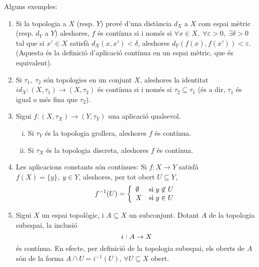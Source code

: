\documentclass[../main.tex]{subfiles}
\begin{document}
\begin{ej}
\label{ej:appcontesptop} Alguns exemples:
\begin{enumerate}[(1)]
    \item Si la topologia a $X$ (resp. $Y$) prové d'una distància $d_X$ a $X$ com espai mètric (resp. $d_Y$ a $Y$) aleshores, $f$ és contínua si i només si $\forall x\in X,\;\forall \varepsilon>0,\;\exists\delta>0$ tal que si $x'\in X$ satisfà $d_X(x,x')<\delta$, aleshores $d_Y(f(x),f(x'))<\varepsilon$. (Aquesta és la definició d'aplicació contínua en un espai mètric, que és equivalent). 
    
    \item Si $\tau_1,\;\tau_2$ són topologies en un conjunt $X$, aleshores la identitat $id_X:(X,\tau_1)\rightarrow (X,\tau_2)$ és contínua si i només si $\tau_2\subseteq\tau_1$ (és a dir, $\tau_1$ és igual o més fina que $\tau_2$).
    
    \item Sigui $f:(X,\tau_X)\rightarrow (Y,\tau_Y)$ una aplicació qualsevol.
    \begin{enumerate}[(i)]
        \item Si $\tau_Y$ és la topologia grollera, aleshores $f$ és contínua.
        \item Si $\tau_X$ és la topologia discreta, aleshores $f$ és contínua.
    \end{enumerate}
    
    \item Les aplicacions constants són contínues: Si $f:X\rightarrow Y$ satisfà $f(X) = \{y\},\;y\in Y$, aleshores, per tot obert $U\subseteq Y$,
    \begin{equation}
        \notag
        f^{-1}(U) = \left\{
        \begin{array}{ll}
            \emptyset & \text{si}\;y\not\in U\\
            X & \text{si}\;y\in U
        \end{array}
        \right.
    \end{equation}
    
    \item Sigui $X$ un espai topològic, i $A\subseteq X$ un subconjunt. Dotant $A$ de la topologia subespai, la inclusió
    \begin{equation}
        \notag
        i:A\rightarrow X    
    \end{equation}
    és contínua. En efecte, per definició de la topologia subespai, els oberts de $A$ són de la forma $A\cap U = i^{-1}(U)$, $\forall U\subseteq X$ obert.
\end{enumerate}
\end{ej}
\end{document}

